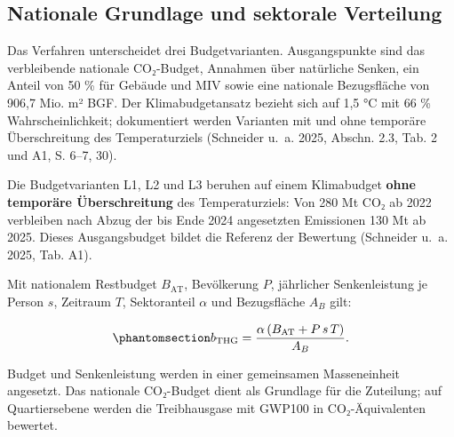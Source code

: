 \documentclass[
  ngerman,
  a4paper,
  DIV=11]{scrreprt}
\begin{document}
\subsection{Nationale Grundlage und sektorale
Verteilung}\label{nationale-grundlage-und-sektorale-verteilung}

Das Verfahren unterscheidet drei Budgetvarianten. Ausgangspunkte sind
das verbleibende nationale CO₂-Budget, Annahmen über natürliche Senken,
ein Anteil von 50 \% für Gebäude und MIV sowie eine nationale
Bezugsfläche von 906,7 Mio. m² BGF. Der Klimabudgetansatz bezieht sich
auf 1,5 °C mit 66 \% Wahrscheinlichkeit; dokumentiert werden Varianten
mit und ohne temporäre Überschreitung des Temperaturziels (Schneider
u.~a. 2025, Abschn. 2.3, Tab. 2 und A1, S. 6--7, 30).

Die Budgetvarianten L1, L2 und L3 beruhen auf einem Klimabudget
\textbf{ohne temporäre Überschreitung} des Temperaturziels: Von 280 Mt
CO₂ ab 2022 verbleiben nach Abzug der bis Ende 2024 angesetzten
Emissionen 130 Mt ab 2025. Dieses Ausgangsbudget bildet die Referenz der
Bewertung (Schneider u.~a. 2025, Tab. A1).

Mit nationalem Restbudget \(B_{\mathrm{AT}}\), Bevölkerung \(P\),
jährlicher Senkenleistung je Person \(s\), Zeitraum \(T\), Sektoranteil
\(\alpha\) und Bezugsfläche \(A_B\) gilt:

\begin{equation}\protect\phantomsection\label{eq-thg-allokation}{
b_{\mathrm{THG}}
=\frac{\alpha\left(B_{\mathrm{AT}}+P\,s\,T\right)}{A_B}.
}\end{equation}

Budget und Senkenleistung werden in einer gemeinsamen Masseneinheit
angesetzt. Das nationale CO₂-Budget dient als Grundlage für die
Zuteilung; auf Quartiersebene werden die Treibhausgase mit GWP100 in
CO₂-Äquivalenten bewertet.
\end{document}
